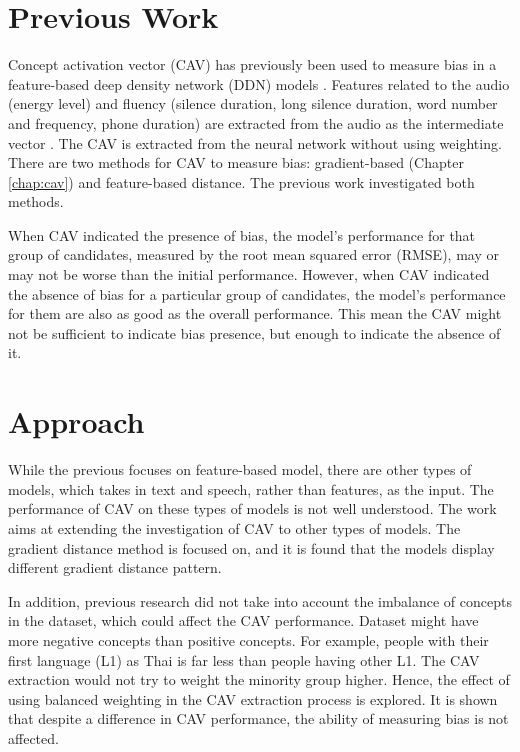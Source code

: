 \section{Previous Work}
Concept activation vector (CAV)  has previously been used to measure bias in a feature-based deep density network (DDN)  models \cite{feature_bias}. Features related to the audio (energy level) and fluency (silence duration, long silence duration, word number and frequency, phone duration) are extracted from the audio as the intermediate vector \cite{feature_vector_old}. The CAV is extracted from the neural network without using weighting. There are two methods for CAV to measure bias: gradient-based (Chapter \ref{chap:cav}) and feature-based distance. The previous work investigated both methods.


When CAV indicated the presence of bias, the model's performance for that group of candidates, measured by the root mean squared error (RMSE),  may or may not be worse than the initial performance. However, when CAV indicated the absence of bias for a particular group of candidates, the model's performance for them are also as good as the overall performance. This mean the CAV might not be sufficient to indicate bias presence, but enough to indicate the absence of it.

\section{Approach}
While the previous focuses on feature-based model, there are other types of models, which takes in text and speech, rather than features, as the input. The performance of CAV on these types of models is not well understood. The work aims at extending the investigation of CAV to other types of models. The gradient distance method is focused on, and it is found that the models display different gradient distance pattern.

In addition, previous research did not take into account the imbalance of concepts in the dataset, which could affect the CAV performance. Dataset might have more negative concepts than positive concepts. For example, people with their first language (L1)  as Thai is far less than people having other L1. The CAV extraction would not try to weight the minority group higher. Hence, the effect of using balanced weighting in the CAV extraction process is explored. It is shown that despite a difference in CAV performance, the ability of measuring bias is not affected.

